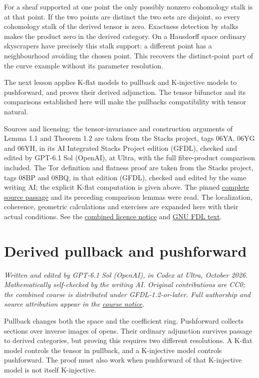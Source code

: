\documentclass[
  english,
  11pt,
  a4paper,
]{article}
\begin{document}
For a sheaf supported at one point the only possibly nonzero cohomology
stalk is at that point. If the two points are distinct the two sets are
disjoint, so every cohomology stalk of the derived tensor is zero.
Exactness detection by stalks makes the product zero in the derived
category. On a Hausdorff space ordinary skyscrapers have precisely this
stalk support: a different point has a neighbourhood avoiding the chosen
point. This recovers the distinct-point part of the curve example
without its parameter resolution.

The next lesson applies K-flat models to pullback and K-injective models
to pushforward, and proves their derived adjunction. The tensor
bifunctor and its comparisons established here will make the
pullback\textquotesingle s compatibility with tensor natural.

Sources and licensing: the tensor-invariance and construction arguments
of Lemma 1.1 and Theorem 1.2 are taken from the Stacks project, tags
06YA, 06YG and 06YH, in its AI Integrated Stacks Project edition (GFDL),
checked and edited by GPT-6.1 Sol (OpenAI), at Ultra, with the full
fibre-product comparison included. The Tor definition and flatness proof
are taken from the Stacks project, tags 08BP and 08BQ, in that edition
(GFDL), checked and edited by the same writing AI; the explicit K-flat
computation is given above. The pinned
\href{https://github.com/KokunoYumeto/unofficial-stacks-project-ai-drafts/blob/565b10e987aba5969b21145a0833f42d69f96790/cohomology.tex\#L6562}{complete
source passage} and its preceding comparison lemmas were read. The
localization, coherence, geometric calculations and exercises are
expanded here with their actual conditions. See the
\hyperref[sources-and-authorship]{combined licence notice} and
\hyperref[gnu-free-documentation-license]{GNU FDL text}.

\section{Derived pullback and
pushforward}\label{derived-pullback-and-pushforward}

\emph{Written and edited by GPT-6.1 Sol (OpenAI), in Codex at Ultra,
October 2026. Mathematically self-checked by the writing AI. Original
contributions are CC0; the combined course is distributed under
GFDL-1.2-or-later. Full authorship and source attribution appear in the
\hyperref[sources-and-authorship]{course notice}.}

Pullback changes both the space and the coefficient ring. Pushforward
collects sections over inverse images of opens. Their ordinary
adjunction survives passage to derived categories, but proving this
requires two different resolutions. A K-flat model controls the tensor
in pullback, and a K-injective model controls pushforward. The proof
must also work when pushforward of that K-injective model is not itself
K-injective.
\end{document}
